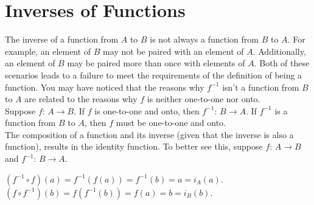 \documentclass{article}
\begin{document}
\section{Inverses of Functions}
The inverse of a function from $A$ to $B$ is not always a function from $B$ to $A$. For example, an element of $B$ may not be paired with an element of $A$. Additionally, an element of $B$ may be paired more than once with elements of $A$. Both of these scenarios leads to a failure to meet the requirements of the definition of being a function. You may have noticed that the reasons why $f^{-1}$ isn't a function from $B$ to $A$ are related to the reasons why $f$ is neither one-to-one nor onto.\\

\noindent Suppose $f \text{: } A \to B$. If $f$ is one-to-one and onto, then $f^{-1} \text{: } B \to A$. If $f^{-1}$ is a function from $B$ to $A$, then $f$ must be one-to-one and onto. \\

\noindent The composition of a function and its inverse (given that the inverse is also a function), results in the identity function. To better see this, suppose $f \text{: } A \to B$ and $f^{-1} \text{: } B \to A$.
\begin{center}
    $(f^{-1} \circ f)(a) = f^{-1}(f(a)) = f^{-1}(b) = a = i_{A}(a)$.
$(f \circ f^{-1})(b) = f(f^{-1}(b)) = f(a) = b = i_{B}(b)$.
\end{center}
\clearpage
\printglossary[type=\acronymtype,style=long]  %
\printglossary[type=symbolslist,style=long]   %
\printglossary[type=main]                     %
\end{document}
